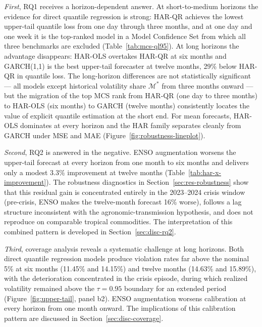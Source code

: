\textit{First}, RQ1 receives a horizon-dependent answer. At short-to-medium
horizons the evidence for direct quantile regression is strong: HAR-QR
achieves the lowest upper-tail quantile loss from one day through three
months, and at one day and one week it is the top-ranked model in a Model
Confidence Set from which all three benchmarks are excluded
(Table~\ref{tab:mcs-ql95}). At long horizons the advantage disappears:
HAR-OLS overtakes HAR-QR at six months and GARCH(1,1) is the best
upper-tail forecaster at twelve months, 29\% below HAR-QR in quantile
loss. The long-horizon differences are not statistically significant ---
all models except historical volatility share $\mathcal{M}^{*}$ from three
months onward --- but the migration of the top MCS rank from HAR-QR (one
day to three months) to HAR-OLS (six months) to GARCH (twelve months)
consistently locates the value of explicit quantile estimation at the
short end. For mean forecasts, HAR-OLS dominates at every horizon and the
HAR family separates cleanly from GARCH under MSE and MAE
(Figure~\ref{fig:robustness-lineplot}).

\textit{Second}, RQ2 is answered in the negative. ENSO augmentation
worsens the upper-tail forecast at every horizon from one month to six
months and delivers only a modest $3.3\%$ improvement at twelve months
(Table~\ref{tab:har-x-improvement}). The robustness diagnostics in
Section~\ref{sec:res-robustness} show that this residual gain is
concentrated entirely in the 2023--2024 crisis window (pre-crisis, ENSO
makes the twelve-month forecast 16\% worse), follows a lag structure
inconsistent with the agronomic-transmission hypothesis, and does not
reproduce on comparable tropical commodities. The interpretation of this
combined pattern is developed in Section~\ref{sec:disc-rq2}.

\textit{Third}, coverage analysis reveals a systematic challenge at long
horizons. Both direct quantile regression models produce violation rates
far above the nominal 5\% at six months (11.45\% and 14.15\%) and twelve
months (14.63\% and 15.89\%), with the deterioration concentrated in the
crisis episode, during which realized volatility remained above the
$\tau = 0.95$ boundary for an extended period
(Figure~\ref{fig:upper-tail}, panel b2). ENSO augmentation worsens
calibration at every horizon from one month onward. The implications of
this calibration pattern are discussed in Section~\ref{sec:disc-coverage}.
